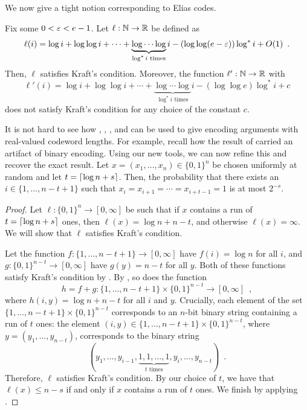 \documentclass{patmorin}
\newenvironment{customthm}[1]
  {\renewcommand\theinnercustomthm{#1}\innercustomthm}
  {\endinnercustomthm}
\begin{document}
We now give a tight notion corresponding to Elias codes.
\begin{thm}
  Fix some $0 < \varepsilon < e - 1$. Let $\ell : \mathbb{N} \to \mathbb{R}$ be defined as
  \[
  \ell(i) = \log i + \log \log i + \cdots + \underbrace{\log \cdots
    \log}_{\text{$\log^* i$ times}} i - (\log \log (e - \varepsilon)) \log^*
  i + O(1) \enspace .
  \]
  Then, $\ell$ satisfies Kraft's condition. Moreover, the function
  $\ell' : \mathbb{N} \to \mathbb{R}$ with
  \[
  \ell'(i) = \log i + \log \log i + \cdots + \underbrace{\log \cdots
    \log}_{\text{$\log^* i$ times}} i - (\log \log e) \log^* i + c
  \]
  does not satisfy Kraft's condition for any choice of the constant
  $c$.
\end{thm}

It is not hard to see how , ,
, and  can be used to
give encoding arguments with real-valued codeword lengths. For
example, recall how the result of  carried an artifact
of binary encoding. Using our new tools, we can now refine this and
recover the exact result.
\begin{customthm}{\ref*{thm:runs-i}b}
  Let $x=(x_1,\ldots,x_n)\in\{0,1\}^n$ be chosen uniformly at random
  and let $t = {\lceil \log n + s \rceil}$. Then, the probability that there
  exists an $i\in\{1,\ldots,n-t+1\}$ such that
  $x_i=x_{i+1}=\cdots=x_{i+t-1}=1$ is at most $2^{-s}$.
\end{customthm}
\begin{proof}
  Let $\ell : \{0, 1\}^n \to [0, \infty]$ be such that if $x$ contains
  a run of $t = {\lceil \log n + s \rceil}$ ones, then
  $\ell(x) = \log n + n - t$, and otherwise $\ell(x) = \infty$. We
  will show that $\ell$ satisfies Kraft's condition.


  Let the function $f : \{1, \ldots, n - t + 1\} \to [0, \infty]$ have
  $f(i) = \log n$ for all $i$, and
  $g : \{0, 1\}^{n - t} \to [0, \infty]$ have $g(y) = n - t$ for all
  $y$. Both of these functions satisfy Kraft's condition by
  . By , so does
  the function
  \[
    h = f + g : \{1, \ldots, n - t + 1\} \times \{0, 1\}^{n - t} \to
    [0, \infty] \enspace ,
  \]
  where $h(i, y) = \log n + n - t$ for all $i$ and $y$. Crucially,
  each element of the set $\{1, \ldots, n - t + 1\} \times \{0, 1\}^{n
    - t}$ corresponds to an $n$-bit binary string containing a run of
  $t$ ones: the element $(i, y) \in \{1, \ldots, n - t + 1\} \times
  \{0, 1\}^{n - t}$, where $y = (y_1, \ldots, y_{n - t})$, corresponds
  to the binary string
  \[
  (y_1, \dots, y_{i - 1}, \underbrace{1, 1, \dots, 1}_{\text{$t$ times}},
  y_i, \dots, y_{n - t}) \enspace .
  \]
  Therefore, $\ell$ satisfies Kraft's condition. By our choice of
  $t$, we have that $\ell(x) \leq n - s$ if and only if $x$ contains a
  run of $t$ ones. We finish by applying .
\end{proof}
\end{document}
